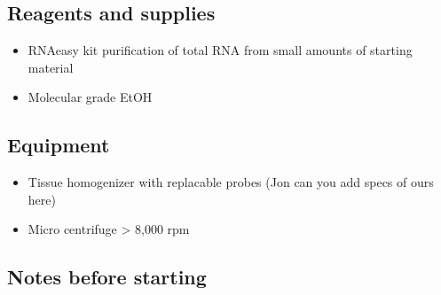 \documentclass[
  letterpaper,
  DIV=11,
  numbers=noendperiod]{scrreprt}
\begin{document}

\hypertarget{reagents-and-supplies}{%
\subsection*{\texorpdfstring{\textbf{Reagents and
supplies}}{Reagents and supplies}}\label{reagents-and-supplies}}

\begin{itemize}
\item
  RNAeasy kit purification of total RNA from small amounts of starting
  material
\item
  Molecular grade EtOH
\end{itemize}

\hypertarget{equipment-1}{%
\subsection*{\texorpdfstring{\textbf{Equipment}}{Equipment}}\label{equipment-1}}

\begin{itemize}
\item
  Tissue homogenizer with replacable probes (Jon can you add specs of
  ours here)
\item
  Micro centrifuge \textgreater{} 8,000 rpm
\end{itemize}

\hypertarget{notes-before-starting}{%
\subsection*{\texorpdfstring{\textbf{Notes before
starting}}{Notes before starting}}\label{notes-before-starting}}
\end{document}
